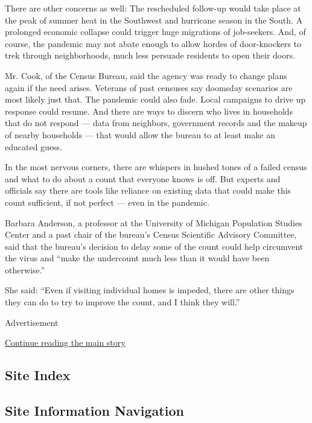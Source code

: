 There are other concerns as well: The rescheduled follow-up would take
place at the peak of summer heat in the Southwest and hurricane season
in the South. A prolonged economic collapse could trigger huge
migrations of job-seekers. And, of course, the pandemic may not abate
enough to allow hordes of door-knockers to trek through neighborhoods,
much less persuade residents to open their doors.

Mr. Cook, of the Census Bureau, said the agency was ready to change
plans again if the need arises. Veterans of past censuses say doomsday
scenarios are most likely just that. The pandemic could also fade. Local
campaigns to drive up response could resume. And there are ways to
discern who lives in households that do not respond --- data from
neighbors, government records and the makeup of nearby households ---
that would allow the bureau to at least make an educated guess.

In the most nervous corners, there are whispers in hushed tones of a
failed census and what to do about a count that everyone knows is off.
But experts and officials say there are tools like reliance on existing
data that could make this count sufficient, if not perfect --- even in
the pandemic.

Barbara Anderson, a professor at the University of Michigan Population
Studies Center and a past chair of the bureau's Census Scientific
Advisory Committee, said that the bureau's decision to delay some of the
count could help circumvent the virus and ``make the undercount much
less than it would have been otherwise.''

She said: ``Even if visiting individual homes is impeded, there are
other things they can do to try to improve the count, and I think they
will.''

Advertisement

\protect\hyperlink{after-bottom}{Continue reading the main story}

\hypertarget{site-index}{%
\subsection{Site Index}\label{site-index}}

\hypertarget{site-information-navigation}{%
\subsection{Site Information
Navigation}\label{site-information-navigation}}

